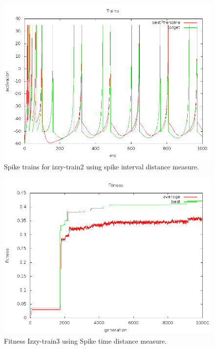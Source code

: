 \documentclass[a4paper]{article}
\begin{document}
\begin{figure}[htb!]
  \centering
  \includegraphics[width=\textwidth]{Waveform-izzy2-trains-plot.png}
  \caption{Spike trains for izzy-train2 using spike interval distance measure.}
\end{figure}

\newpage

\begin{figure}[htb!]
  \centering
  \includegraphics[width=\textwidth]{SpikeTime-izzy3-fitness-plot.png}
  \caption{Fitness Izzy-train3 using Spike time distance measure.}
\end{figure}
\end{document}
